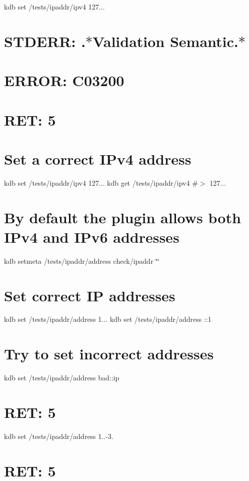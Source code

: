 kdb set /tests/ipaddr/ipv4 127... \section*{S\+T\+D\+E\+RR\+: .$\ast$\+Validation Semantic.$\ast$}

\section*{E\+R\+R\+OR\+: C03200}

\section*{R\+ET\+: 5}

\section*{Set a correct I\+Pv4 address}

kdb set /tests/ipaddr/ipv4 127... kdb get /tests/ipaddr/ipv4 \#$>$ 127...

\section*{By default the plugin allows both I\+Pv4 and I\+Pv6 addresses}

kdb setmeta /tests/ipaddr/address check/ipaddr \char`\"{}\char`\"{}

\section*{Set correct IP addresses}

kdb set /tests/ipaddr/address 1... kdb set /tests/ipaddr/address \+:\+:1

\section*{Try to set incorrect addresses}

kdb set /tests/ipaddr/address bad\+::ip \section*{R\+ET\+: 5}

kdb set /tests/ipaddr/address 1..-\/3. \section*{R\+ET\+: 5}


